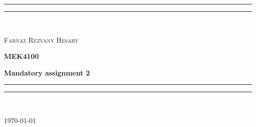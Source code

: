 \documentclass[main.tex]{subfiles}
\newlength{\drop}
\begin{document}
	\begin{titlepage}
    	\textheight
    	\centering
    	\vspace*{\baselineskip}
    	\textheight
    	\rule{\textwidth}{1.6pt}\vspace*{-\baselineskip}\vspace*{4pt}
    	\rule{\textwidth}{0.4pt}\\[\baselineskip]
		{\scshape\LARGE Farnaz Rezvany Hesary \par}
		\vspace{1.5cm}
		{\huge\bfseries MEK4100 \par}
		\vspace{1.5cm}
		{\huge\bfseries Mandatory assignment 2 \par}
    	\rule{\textwidth}{1.6pt}\vspace*{-\baselineskip}\vspace*{4pt}
    	\rule{\textwidth}{0.4pt}\\[\baselineskip]
    	
		\vfill


		{\LARGE \today\par}
	\end{titlepage}
\end{document}
